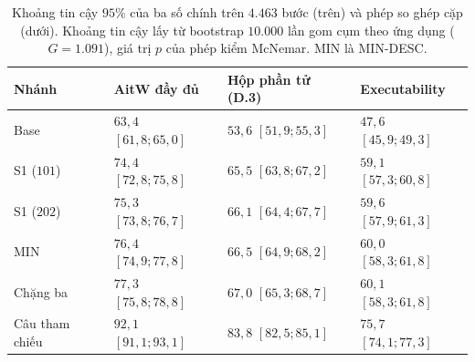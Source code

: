\begin{table}[t]
\caption{Khoảng tin cậy $95\%$ của ba số chính trên $4.463$ bước (trên) và phép so ghép cặp (dưới). Khoảng tin cậy lấy từ bootstrap $10.000$ lần gom cụm theo ứng dụng ($G = 1.091$), giá trị $p$ của phép kiểm McNemar. MIN là MIN-DESC.}
\label{tab:d3ktc}
\centering\footnotesize
\renewcommand{\arraystretch}{1.15}
\setlength{\tabcolsep}{3pt}
\begin{tabular}{@{}llll@{}}
\toprule
Nhánh & AitW đầy đủ & Hộp phần tử (D.3) & Executability \\
\midrule
Base & $63{,}4$ $[61{,}8; 65{,}0]$ & $53{,}6$ $[51{,}9; 55{,}3]$ & $47{,}6$ $[45{,}9; 49{,}3]$ \\
S1 ($101$) & $74{,}4$ $[72{,}8; 75{,}8]$ & $65{,}5$ $[63{,}8; 67{,}2]$ & $59{,}1$ $[57{,}3; 60{,}8]$ \\
S1 ($202$) & $75{,}3$ $[73{,}8; 76{,}7]$ & $66{,}1$ $[64{,}4; 67{,}7]$ & $59{,}6$ $[57{,}9; 61{,}3]$ \\
MIN & $76{,}4$ $[74{,}9; 77{,}8]$ & $66{,}5$ $[64{,}9; 68{,}2]$ & $60{,}0$ $[58{,}3; 61{,}8]$ \\
Chặng ba & $77{,}3$ $[75{,}8; 78{,}8]$ & $67{,}0$ $[65{,}3; 68{,}7]$ & $60{,}1$ $[58{,}3; 61{,}8]$ \\
Câu tham chiếu & $92{,}1$ $[91{,}1; 93{,}1]$ & $83{,}8$ $[82{,}5; 85{,}1]$ & $75{,}7$ $[74{,}1; 77{,}3]$ \\
\bottomrule
\end{tabular}


\end{table}
